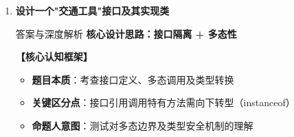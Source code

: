 \documentclass[12pt, a4paper]{ctexart}
\newcommand{\code}[1]{\texttt{#1}}
\begin{document}
\begin{enumerate}[label=\textbf{\arabic*.}, leftmargin=*, itemsep=1.5em]
\begin{bluebox}{答案与深度解析}
		      \textbf{【命题陷阱破解】}
		      \begin{itemize}[leftmargin=*, nosep]
			      \item 陷阱：使用 \code{-} 比较 double 导致精度问题或溢出
			      \item 陷阱：TreeSet 去重依赖 compareTo 返回 0，而非 equals
			      \item 破解：确保 compareTo 逻辑覆盖所有相等场景
		      \end{itemize}
	      \end{bluebox}

	\item \textbf{设计一个"交通工具"接口及其实现类}
	      \begin{bluebox}{答案与深度解析}
		      \textbf{核心设计思路：接口隔离 + 多态性}

		      \textbf{【核心认知框架】}
		      \begin{itemize}[leftmargin=*, nosep]
			      \item \textbf{题目本质}：考查接口定义、多态调用及类型转换
			      \item \textbf{关键区分点}：接口引用调用特有方法需向下转型（instanceof）
			      \item \textbf{命题人意图}：测试对多态边界及类型安全机制的理解
		      \end{itemize}


\end{bluebox}
\end{enumerate}
\end{document}
